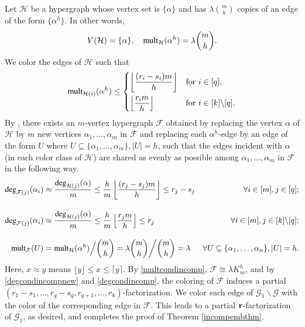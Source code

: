 \documentclass[12pt,oneside]{amsart}
\newcommand\mult{\operatorname{\textup{{\fontfamily{ptm}\selectfont mult}}}}
\newcommand\dg{\operatorname{\textup{{\fontfamily{ptm}\selectfont deg}}}}
\newcommand{\cc}{\mathcal}
\newcommand\rounddown[1]{\left\lfloor#1\right\rfloor}
\begin{document}
Let $\cc H$ be a hypergraph whose vertex set is $\{\alpha\}$ and has ${\lambda \binom{m}{h}}$ copies of an edge of the form $\{\alpha^h\}$. In other words,
$$
V(\cc H)=\{\alpha\}, \quad \mult_\cc H(\alpha^h)=\lambda\binom{m}{h}.
$$
We color the edges of $\cc H$ such that
\begin{align*}
  \mult_{\cc H(i)}(\alpha^h)\leq
  \begin{cases}
    \rounddown{\dfrac{(r_i-s_i) m}{h}}
    &
    {\text{for}}\ i\in [q],
    \\[10pt]
    \rounddown{\dfrac{r_i m}{h}}
    &
    \text{for}\ i\in [k]\backslash[q].
  \end{cases}
\end{align*}
By \cite[Theorem 4.1]{MR2942724}, there exists an $m$-vertex hypergraph $\cc F$ obtained by replacing the vertex $\alpha$ of $\cc H$ by $m$ new vertices $\alpha_1,\dots,\alpha_m$ in $\cc F$ and replacing each $\alpha^h$-edge by an edge of the form $U$ where $U\subseteq \{\alpha_1,\dots,\alpha_{m}\}, |U|=h$, such that the edges incident with $\alpha$ (in each color class of $\cc H$) are shared as evenly as possible among $\alpha_1,\dots,\alpha_m$ in $\cc F$ in the following way. 
\begin{align} 
        \dg_{\cc F(j)}(\alpha_i)&\approx\dfrac{\dg_{\cc H(j)}(\alpha)}{m}\leq\dfrac{h}{m}\rounddown{\dfrac{(r_j-s_j) m}{h}}\leq r_j-s_j  &\forall i\in [m],j\in [q]; \label{degcondincompnew}\\[10pt]
        \dg_{\cc F(j)}(\alpha_i)&\approx\dfrac{\dg_{\cc H(j)}(\alpha)}{m}\leq\dfrac{h}{m}\rounddown{\dfrac{r_j m}{h}}\leq r_j  &\forall i\in [m],j\in [k]\backslash[q];\label{degcondincomp} \\[10pt]
        \mult_{\cc F}(U)&=\mult_{\cc H}(\alpha^h)\Big/\binom{m}{h}=\lambda\dbinom{m}{h}\bigg/\dbinom{m}{h}=\lambda  &\forall U\subseteq \{\alpha_1,\dots,\alpha_{n}\}, |U|=h.  \label{multcondincomp}      
\end{align}
Here, $x \approx y$ means $\lfloor y \rfloor\leq x\leq  \lceil y \rceil$. By \eqref{multcondincomp}, $\cc F \cong \lambda K_m^h$, and by \eqref{degcondincompnew} and \eqref{degcondincomp}, the coloring of $\cc F$ induces a partial $(r_1-s_1,\dots,r_q-s_q,r_{q+1},\dots,r_k)$-factorization. We color each edge of $\cc G_1 \backslash \mathcal G$ with the color of the corresponding edge in $\cc F$. This leads to a partial $\vb r$-factorization of $\cc G_1$, as desired, and completes the proof of Theorem \ref{incompembthm}.
\end{document}

